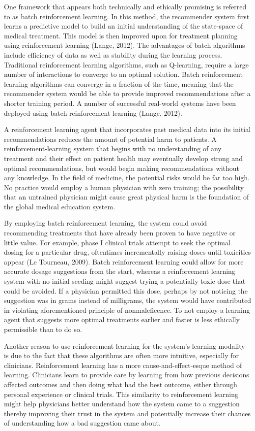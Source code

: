 \documentclass[]{spie}  %
\begin{document}
One framework that appears both technically and ethically promising is referred to as batch reinforcement learning. In this method, the recommender system first learns a predictive model to build an initial understanding of the state-space of medical treatment. This model is then improved upon for treatment planning using reinforcement learning (Lange, 2012). The advantages of batch algorithms include efficiency of data as well as stability during the learning process. Traditional reinforcement learning algorithms, such as Q-learning, require a large number of interactions to converge to an optimal solution. Batch reinforcement learning algorithms can converge in a fraction of the time, meaning that the recommender system would be able to provide improved recommendations after a shorter training period. A number of successful real-world systems have been deployed using batch reinforcement learning (Lange, 2012).

A reinforcement learning agent that incorporates past medical data into its initial recommendations reduces the amount of potential harm to patients. A reinforcement-learning system that begins with no understanding of any treatment and their effect on patient health may eventually develop strong and optimal recommendations, but would begin making recommendations without any knowledge. In the field of medicine, the potential risks would be far too high. No practice would employ a human physician with zero training; the possibility that an untrained physician might cause great physical harm is the foundation of the global medical education system.

By employing batch reinforcement learning, the system could avoid recommending treatments that have already been proven to have negative or little value. For example, phase I clinical trials attempt to seek the optimal dosing for a particular drug, oftentimes incrementally raising doses until toxicities appear (Le Tourneau, 2009). Batch reinforcement learning could allow for more accurate dosage suggestions from the start, whereas a reinforcement learning system with no initial seeding might suggest trying a potentially toxic dose that could be avoided. If a physician permitted this dose, perhaps by not noticing the suggestion was in grams instead of milligrams, the system would have contributed in violating aforementioned principle of nonmaleficence. To not employ a learning agent that suggests more optimal treatments earlier and faster is less ethically permissible than to do so.

Another reason to use reinforcement learning for the system’s learning modality is due to the fact that these algorithms are often more intuitive, especially for clinicians. Reinforcement learning has a more cause-and-effect-esque method of learning. Clinicians learn to provide care by learning from how previous decisions affected outcomes and then doing what had the best outcome, either through personal experience or clinical trials. This similarity to reinforcement learning might help physicians better understand how the system came to a suggestion thereby improving their trust in the system and potentially increase their chances of understanding how a bad suggestion came about.
\end{document}
